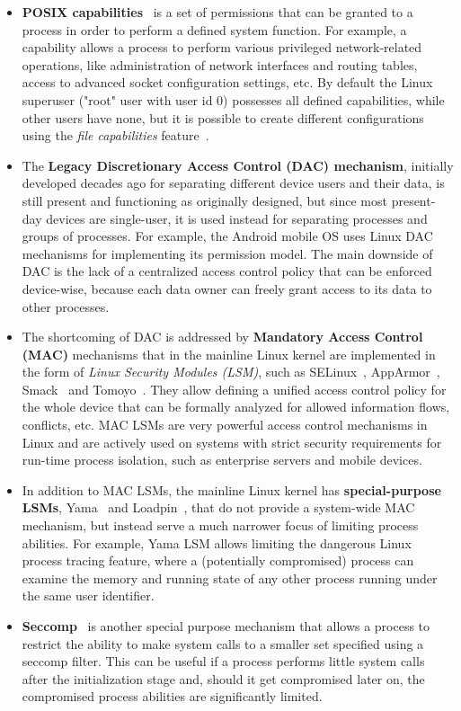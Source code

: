 \begin{itemize}
	\item \textbf{POSIX capabilities}~\cite{caps} is a set of permissions that can be granted to a process in order to perform a defined system function. For example, a  capability allows a process to perform various privileged network-related operations, like administration of network interfaces and routing tables, access to advanced socket configuration settings, etc. By default the Linux superuser ("root" user with user id 0) possesses all defined capabilities, while other users have none, but it is possible to create different configurations using the \textit{file capabilities} feature~\cite{filecaps}. 
	\item The \textbf{Legacy Discretionary Access Control (DAC) mechanism}, initially developed decades ago for separating different device users and their data, is still present and functioning as originally designed, but since most present-day devices are single-user, it is used instead for separating processes and groups of processes. For example, the Android mobile OS uses Linux DAC mechanisms for implementing its permission model. The main downside of DAC is the lack of a centralized access control policy that can be enforced device-wise, because each data owner can freely grant access to its data to other processes. 
	\item The shortcoming of DAC is addressed by \textbf{Mandatory Access Control (MAC)} mechanisms that in the mainline Linux kernel are implemented in the form of \textit{Linux Security Modules (LSM)}, such as SELinux~\cite{smalley2001implementing}, AppArmor~\cite{bauer2006paranoid}, Smack~\cite{bauer2006paranoid} and Tomoyo~\cite{tomoyo}. They allow defining a unified access control policy for the whole device that can be formally analyzed for allowed information flows, conflicts, etc. MAC LSMs are very powerful access control mechanisms in Linux and are actively used on systems with strict security requirements for run-time process isolation, such as enterprise servers and mobile devices. 
	\item In addition to MAC LSMs, the mainline Linux kernel has \textbf{special-purpose LSMs}, Yama~\cite{yama} and Loadpin~\cite{loadpin}, that do not provide a system-wide MAC mechanism, but instead serve a much narrower focus of limiting process abilities. For example, Yama LSM allows limiting the dangerous Linux process tracing feature, where a (potentially compromised) process can examine the memory and running state of any other process running under the same user identifier. 
	\item \textbf{Seccomp}~\cite{seccomp2016} is another special purpose mechanism that allows a process to restrict the ability to make system calls to a smaller set specified using a seccomp filter. This can be useful if a process performs little system calls after the initialization stage and, should it get compromised later on, the compromised process abilities are significantly limited.
\end{itemize} 

